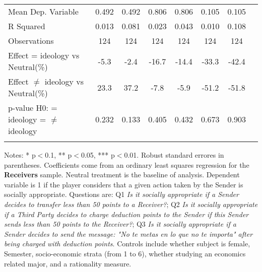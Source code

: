 \begin{table}[H]
{\begin{threeparttable}
\begin{tabular}{lccccccc}
\midrule
Mean Dep. Variable  &       0.492         &       0.492         &       0.806         &       0.806         &       0.105         &       0.105         \\
R Squared           &       0.013         &       0.081         &       0.023         &       0.043         &       0.010         &       0.108         \\
Observations        &         124         &         124         &         124         &         124         &         124         &         124         \\
\midrule
Effect = ideology vs Neutral(\%)&        -5.3         &        -2.4         &       -16.7         &       -14.4         &       -33.3         &       -42.4         \\
Effect $\neq$ ideology vs Neutral(\%)&        23.3         &        37.2         &        -7.8         &        -5.9         &       -51.2         &       -51.8         \\
p-value H0: = ideology = $\neq$ ideology&       0.232         &       0.133         &       0.405         &       0.432         &       0.673         &       0.903         \\
\bottomrule[0.5pt]
\label{tab:table2}
\end{tabular}
\vspace{-13pt}
\begin{tablenotes}[flushleft]{\setlength{\itemindent}{-3pt}}
\small
\item
Notes:
*
p$<$0.1,
**
p$<$0.05,
***
p$<$0.01.
Robust
standard
errores
in
parentheses.
Coefficients
come
from
an
ordinary
least
squares
regression
for
the
\textbf{Receivers}
sample.
Neutral
treatment
is
the
baseline
of
analysis.
Dependent
variable
is
1
if
the
player
considers
that
a
given
action
taken
by
the
Sender
is
socially
appropriate.
Questions
are:
Q1
\textit{Is
it
socially
appropriate
if
a
Sender
decides
to
transfer
less
than
50
points
to
a
Receiver?};
Q2
\textit{Is
it
socially
appropriate
if
a
Third
Party
decides
to
charge
deduction
points
to
the
Sender
if
this
Sender
sends
less
than
50
points
to
the
Receiver?};
Q3
\textit{Is
it
socially
appropriate
if
a
Sender
decides
to
send
the
message:
\textit{"No
te
metas
en
lo
que
no
te
importa"}
after
being
charged
with
deduction
points}.
Controls
include
whether
subject
is
female,
Semester,
socio-economic
strata
(from
1
to
6),
whether
studying
an
economics
related
major,
and
a
rationality
measure.
\end{tablenotes}
\end{threeparttable}
}
\end{table}

